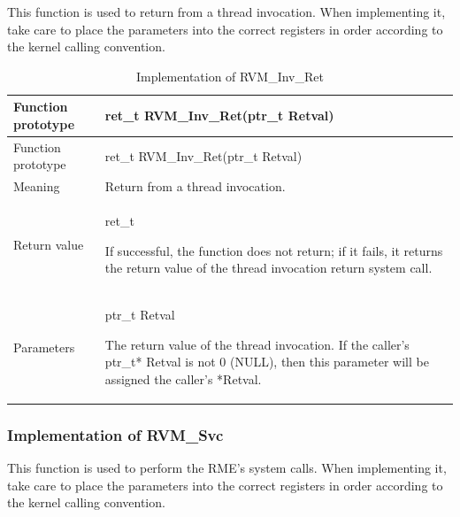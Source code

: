 This function is used to return from a thread invocation. When implementing it, take care to place the parameters into the correct registers in order according to the kernel calling convention.

\begin{xltabular}{\textwidth}{@{}>{\hsize\raggedright\arraybackslash}X>{\hsize\raggedright\arraybackslash}X@{}}
\caption{Implementation of RVM\_\allowbreak{}Inv\_\allowbreak{}Ret}\label{tab:8-11}\\
\toprule
Function prototype & ret\_\allowbreak{}t RVM\_\allowbreak{}Inv\_\allowbreak{}Ret(ptr\_\allowbreak{}t Retval)\tabularnewline
\endfirsthead
\toprule
Function prototype & ret\_\allowbreak{}t RVM\_\allowbreak{}Inv\_\allowbreak{}Ret(ptr\_\allowbreak{}t Retval)\tabularnewline
\midrule
\endhead
\bottomrule
\endlastfoot
Meaning & Return from a thread invocation.\tabularnewline
Return value\strut
 & ret\_\allowbreak{}t

If successful, the function does not return; if it fails, it returns the return value of the thread invocation return system call.\strut
\tabularnewline
Parameters\strut
 & ptr\_\allowbreak{}t Retval

The return value of the thread invocation. If the caller's ptr\_t* Retval is not 0 (NULL), then this parameter will be assigned the caller's *Retval.\strut
\tabularnewline
\end{xltabular}

\subsubsection{Implementation of RVM\_Svc}\label{subsubsec:8-2-6-6}

This function is used to perform the RME's system calls. When implementing it, take care to place the parameters into the correct registers in order according to the kernel calling convention.

